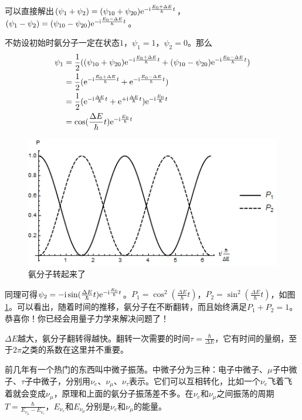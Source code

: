 可以直接解出$(\psi_1+\psi_2)=(\psi_{1 0}+\psi_{2 0}) \mathrm{e}^{-\mathrm{i} \frac{E_0+\Delta E}{\hbar} t}$，$(\psi_1-\psi_2)=(\psi_{1 0}-\psi_{2 0}) \mathrm{e}^{-\mathrm{i} \frac{E_0-\Delta E}{\hbar} t}$。

不妨设初始时氨分子一定在状态$1$，$\psi_1=1$，$\psi_2=0$。那么
\begin{align*}
\psi_1&=\frac{1}{2}((\psi_{1 0}+\psi_{2 0}) \mathrm{e}^{-\mathrm{i} \frac{E_0+\Delta E}{\hbar} t}+(\psi_{1 0}-\psi_{2 0}) \mathrm{e}^{-\mathrm{i} \frac{E_0-\Delta E}{\hbar} t}) \\
&=\frac{1}{2}(\mathrm{e}^{-\mathrm{i} \frac{E_0+\Delta E}{\hbar} t}+\mathrm{e}^{-\mathrm{i} \frac{E_0-\Delta E}{\hbar} t}) \\
&=\frac{1}{2}(\mathrm{e}^{-\mathrm{i} \frac{\Delta E}{\hbar} t}+\mathrm{e}^{+\mathrm{i} \frac{\Delta E}{\hbar} t}) \mathrm{e}^{-\mathrm{i} \frac{E_0}{\hbar} t} \\
&=\cos (\frac{\Delta E}{\hbar} t) \mathrm{e}^{-\mathrm{i} \frac{E_0}{\hbar} t}
\end{align*}
\begin{figure}[htb]
\centering
\includegraphics[scale=0.5]{fig/ammonia-osc.png}
\caption{氨分子转起来了}
\label{fig-ammonia-osc}
\end{figure}

同理可得$\psi_2=-\mathrm{i} \sin (\frac{\Delta E}{\hbar} t) \mathrm{e}^{-\mathrm{i} \frac{E_0}{\hbar} t}$。$P_1=\cos^2 (\frac{\Delta E}{\hbar} t)$，$P_2=\sin^2 (\frac{\Delta E}{\hbar} t)$，如图\ref{fig-ammonia-osc}。可以看出，随着时间的推移，氨分子在不断翻转，而且始终满足$P_1+P_2=1$。恭喜你！你已经会用量子力学来解决问题了！

$\Delta E$越大，氨分子翻转得越快。翻转一次需要的时间$\tau=\frac{\hbar}{\Delta E}$，它有时间的量纲，至于$2 \pi$之类的系数在这里并不重要。

前几年有一个热门的东西叫中微子振荡。中微子分为三种：电子中微子、$\mu$子中微子、$\tau$子中微子，分别用$\nu_e$、$\nu_\mu$、$\nu_\tau$表示。它们可以互相转化，比如一个$\nu_e$飞着飞着就会变成$\nu_\mu$，原理和上面的氨分子振荡差不多。在$\nu_e$和$\nu_\mu$之间振荡的周期$T=\frac{\hbar}{E_{\nu_\mu}-E_{\nu_e}}$，$E_{\nu_e}$和$E_{\nu_\mu}$分别是$\nu_e$和$\nu_\mu$的能量。

